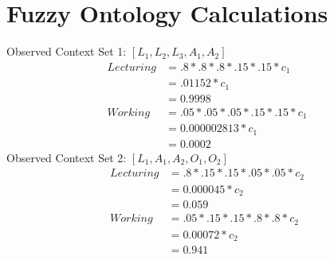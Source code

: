 \documentclass[journal]{vgtc}                %
\begin{document}
\section{Fuzzy Ontology Calculations}
Observed Context Set 1: $[L_1, L_2, L_3, A_1, A_2]$
\begin{align}
                          Lecturing &= .8 * .8 * .8 * .15 * .15 * c_1\\
                                    &= .01152 * c_1\\
                                    &= 0.9998\\
                            Working &= .05 * .05 * .05 * .15 * .15 * c_1\\
                                    &= 0.000002813 * c_1\\
                                    &= 0.0002
\end{align}
Observed Context Set 2: $[L_1, A_1, A_2, O_1, O_2]$
\begin{align}
                          Lecturing &= .8 * .15 * .15 * .05 * .05 * c_2\\
                                    &= 0.000045 * c_2\\
                                    &= 0.059\\
                            Working &= .05 * .15 * .15 * .8 * .8 * c_2\\
                                    &= 0.00072 * c_2\\
                                    &= 0.941
\end{align}
\end{document}
